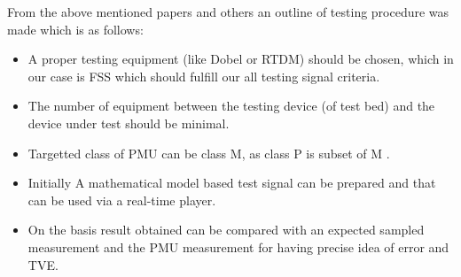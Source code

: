 From the above mentioned papers and others an outline of testing procedure was made which is as follows:
\begin{itemize}
\item A proper testing equipment (like Dobel or RTDM) should be chosen, which in our case is FSS \cite{Paper:saugata} which should fulfill our all testing signal criteria.
\item The number of equipment between the testing device (of test bed) and the device under test should be minimal.
\item Targetted class of PMU can be class M, as class P is subset of M \cite{paper:nrendra}.
\item Initially A mathematical model based test signal can be prepared and that can be used via a real-time player.
\item On the basis result obtained can be compared with an expected sampled measurement and the PMU measurement for having precise idea of error and TVE.
\end{itemize}